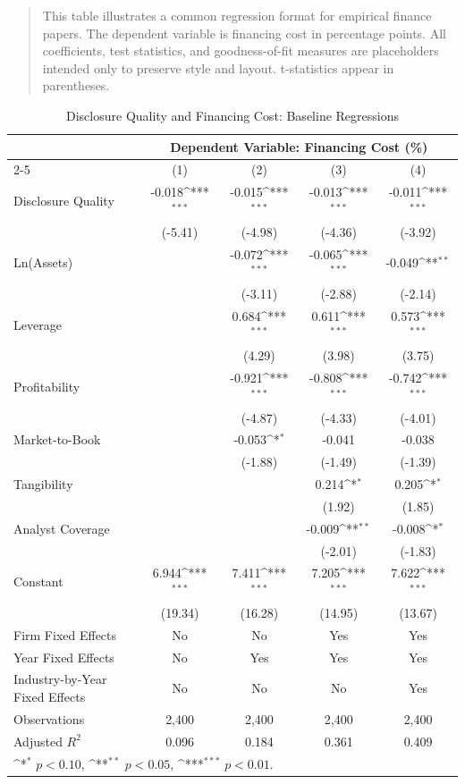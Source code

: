 \documentclass[hidelinks,12pt]{article}
\def\sym#1{\ifmmode^{#1}\else\(^{#1}\)\fi}
\newcommand{\floatnotes}[1]{%
\begin{quotation}
\noindent \scriptsize #1
\end{quotation}
}
\begin{document}
\clearpage
\begin{table}[!htbp]
\centering
\caption{Disclosure Quality and Financing Cost: Baseline Regressions}
\label{tab:baseline}\vspace{-2.5ex}
\floatnotes{This table illustrates a common regression format for empirical finance papers. The dependent variable is financing cost in percentage points. All coefficients, test statistics, and goodness-of-fit measures are placeholders intended only to preserve style and layout. t-statistics appear in parentheses.}
\small
\begin{tabular}{lcccc}
\toprule
 & \multicolumn{4}{c}{Dependent Variable: Financing Cost (\%)} \\
\cmidrule(lr){2-5}
 & (1) & (2) & (3) & (4) \\
\midrule
Disclosure Quality & -0.018\sym{***} & -0.015\sym{***} & -0.013\sym{***} & -0.011\sym{***} \\
 & (-5.41) & (-4.98) & (-4.36) & (-3.92) \\
[0.5ex]
Ln(Assets) &  & -0.072\sym{***} & -0.065\sym{***} & -0.049\sym{**} \\
 &  & (-3.11) & (-2.88) & (-2.14) \\
[0.5ex]
Leverage &  & 0.684\sym{***} & 0.611\sym{***} & 0.573\sym{***} \\
 &  & (4.29) & (3.98) & (3.75) \\
[0.5ex]
Profitability &  & -0.921\sym{***} & -0.808\sym{***} & -0.742\sym{***} \\
 &  & (-4.87) & (-4.33) & (-4.01) \\
[0.5ex]
Market-to-Book &  & -0.053\sym{*} & -0.041 & -0.038 \\
 &  & (-1.88) & (-1.49) & (-1.39) \\
[0.5ex]
Tangibility &  &  & 0.214\sym{*} & 0.205\sym{*} \\
 &  &  & (1.92) & (1.85) \\
[0.5ex]
Analyst Coverage &  &  & -0.009\sym{**} & -0.008\sym{*} \\
 &  &  & (-2.01) & (-1.83) \\
[0.5ex]
Constant & 6.944\sym{***} & 7.411\sym{***} & 7.205\sym{***} & 7.622\sym{***} \\
 & (19.34) & (16.28) & (14.95) & (13.67) \\
\midrule
Firm Fixed Effects & No & No & Yes & Yes \\
Year Fixed Effects & No & Yes & Yes & Yes \\
Industry-by-Year Fixed Effects & No & No & No & Yes \\
Observations & 2,400 & 2,400 & 2,400 & 2,400 \\
Adjusted \(R^2\) & 0.096 & 0.184 & 0.361 & 0.409 \\
\bottomrule
\multicolumn{5}{l}{\footnotesize \sym{*} $p<0.10$, \sym{**} $p<0.05$, \sym{***} $p<0.01$.}
\end{tabular}
\end{table}
\end{document}
